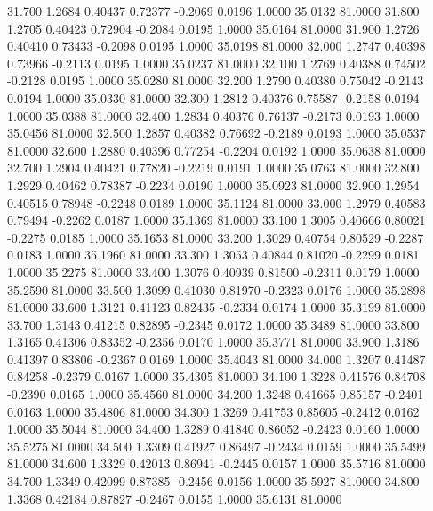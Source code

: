   31.700   1.2684   0.40437   0.72377  -0.2069   0.0196   1.0000  35.0132  81.0000
  31.800   1.2705   0.40423   0.72904  -0.2084   0.0195   1.0000  35.0164  81.0000
  31.900   1.2726   0.40410   0.73433  -0.2098   0.0195   1.0000  35.0198  81.0000
  32.000   1.2747   0.40398   0.73966  -0.2113   0.0195   1.0000  35.0237  81.0000
  32.100   1.2769   0.40388   0.74502  -0.2128   0.0195   1.0000  35.0280  81.0000
  32.200   1.2790   0.40380   0.75042  -0.2143   0.0194   1.0000  35.0330  81.0000
  32.300   1.2812   0.40376   0.75587  -0.2158   0.0194   1.0000  35.0388  81.0000
  32.400   1.2834   0.40376   0.76137  -0.2173   0.0193   1.0000  35.0456  81.0000
  32.500   1.2857   0.40382   0.76692  -0.2189   0.0193   1.0000  35.0537  81.0000
  32.600   1.2880   0.40396   0.77254  -0.2204   0.0192   1.0000  35.0638  81.0000
  32.700   1.2904   0.40421   0.77820  -0.2219   0.0191   1.0000  35.0763  81.0000
  32.800   1.2929   0.40462   0.78387  -0.2234   0.0190   1.0000  35.0923  81.0000
  32.900   1.2954   0.40515   0.78948  -0.2248   0.0189   1.0000  35.1124  81.0000
  33.000   1.2979   0.40583   0.79494  -0.2262   0.0187   1.0000  35.1369  81.0000
  33.100   1.3005   0.40666   0.80021  -0.2275   0.0185   1.0000  35.1653  81.0000
  33.200   1.3029   0.40754   0.80529  -0.2287   0.0183   1.0000  35.1960  81.0000
  33.300   1.3053   0.40844   0.81020  -0.2299   0.0181   1.0000  35.2275  81.0000
  33.400   1.3076   0.40939   0.81500  -0.2311   0.0179   1.0000  35.2590  81.0000
  33.500   1.3099   0.41030   0.81970  -0.2323   0.0176   1.0000  35.2898  81.0000
  33.600   1.3121   0.41123   0.82435  -0.2334   0.0174   1.0000  35.3199  81.0000
  33.700   1.3143   0.41215   0.82895  -0.2345   0.0172   1.0000  35.3489  81.0000
  33.800   1.3165   0.41306   0.83352  -0.2356   0.0170   1.0000  35.3771  81.0000
  33.900   1.3186   0.41397   0.83806  -0.2367   0.0169   1.0000  35.4043  81.0000
  34.000   1.3207   0.41487   0.84258  -0.2379   0.0167   1.0000  35.4305  81.0000
  34.100   1.3228   0.41576   0.84708  -0.2390   0.0165   1.0000  35.4560  81.0000
  34.200   1.3248   0.41665   0.85157  -0.2401   0.0163   1.0000  35.4806  81.0000
  34.300   1.3269   0.41753   0.85605  -0.2412   0.0162   1.0000  35.5044  81.0000
  34.400   1.3289   0.41840   0.86052  -0.2423   0.0160   1.0000  35.5275  81.0000
  34.500   1.3309   0.41927   0.86497  -0.2434   0.0159   1.0000  35.5499  81.0000
  34.600   1.3329   0.42013   0.86941  -0.2445   0.0157   1.0000  35.5716  81.0000
  34.700   1.3349   0.42099   0.87385  -0.2456   0.0156   1.0000  35.5927  81.0000
  34.800   1.3368   0.42184   0.87827  -0.2467   0.0155   1.0000  35.6131  81.0000
